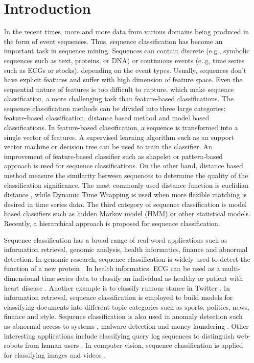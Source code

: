\documentclass{amia}
\begin{document}
\section*{Introduction}
In the recent times, more and more data from various domains being produced in the form of event sequences. Thus, sequence classification has become an important task in sequence mining. Sequences can contain discrete (e.g., symbolic sequences such as text, proteins, or DNA) or continuous events (e..g, time series such as ECGs or stocks), depending on the event types. Usually, sequences don't have explicit features and suffer with high dimension of feature space. Even the sequential nature of features is too difficult to capture, which make sequence classification, a more challenging task than feature-based classifications. The sequence classification methods can be divided into three large categories: feature-based classification, distance based method and model based classifications. In feature-based classification, a sequence is transformed into a single vector of features. A supervised learning algorithm such as an support vector machine \cite{leslie2004fast} or decision tree \cite{chuzhanova1998feature} can be used to train the classifier. An improvement of feature-based classifier such as shapelet \cite{ye2009time} or pattern-based \cite{kudenko1998feature, lesh1999mining} approach is used for sequence classifications. On the other hand, distance based method measure the similarity between sequences to determine the quality of the classification significance. The most commonly used distance function is euclidian distance \cite{keogh2003need}, while Dynamic Time Wrapping \cite{keogh2000scaling} is used when more flexible matching is desired in time series data. The third category of sequence classification is model based classifiers such as hidden Markov model \cite{rabiner1989tutorial} (HMM) or other statistical models. Recently, a hierarchical approach \cite{nallam2016effective} is proposed for sequence classification. 

Sequence classification has a broad range of real word applications such as information retrieval, genomic analysis, health informatics, finance and abnormal detection. In genomic research, sequence classification is widely used to detect the function of a new protein \cite{deshpande2002evaluation}. In health informatics, ECG can be used as a multi-dimensional time series data to classify an individual as healthy or patient with heart disease \cite{wei2006semi}. Another example is to classify rumour stance in Twitter \cite{lukasik2016hawkes}. In information retrieval, sequence classification is employed to build  models for classifying documents into different topic categories \cite{sebastiani2002machine} such as sports, politics, news, finance and style. Sequence classification is also used in anomaly detection such as abnormal access to systems \cite{lane1999temporal}, malware detection \cite{drew2017polymorphic} and money laundering \cite{liu2008sequence}. Other interesting applications include classifying query log sequences to distinguish web-robots from human users \cite{duskin2009distinguishing, tan2004discovery}. In computer vision, sequence classification is applied for classifying images \cite{li2000image} and videos \cite{zhang2016tensor}.    
\end{document}
